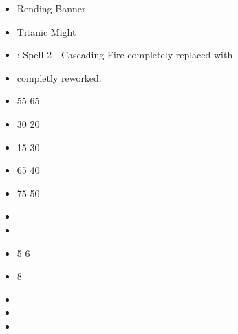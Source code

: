 \begin{itemize}
	\item Rending Banner
	\item Titanic Might
\end{itemize}

\begin{itemize}
	\item \pyromancy{}: Spell 2 - Cascading Fire completely replaced with \pyromancyspelltwo{}
	\item \druidism{} completly reworked.
\end{itemize}


\begin{itemize}
	\item \bindingscroll{} 55 \costup{} 65
	\item \lightningvambraces{} 30 \costdown{} 20
	\item \cleansinglight{} 15 \costup{} 30
	\item \eldritchinscriptions{} 65 \costdown{} 40
	\item \bookofarcanemastery{} 75 \costdown{} 50
\end{itemize}

\begin{itemize}
	\item \alchemyspelltwo{}  \costup{} 
	\item \alchemyspellfour{}  \costdown{} 
	\item \cosmologyspelltwo{} 5 \costup{} 6
	\item \divinationspellsix{} 8 \costup{}  
	\item \shamanismspellfive{}  \costdown{} 
	\item \witchcraftspelltwo{}  \costup{}   \costup{} 
	\item \witchcraftspellfour{}  \costdown{}   \costdown{} 
\end{itemize}